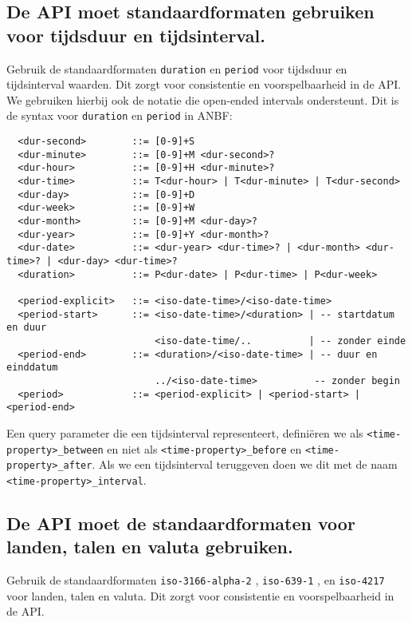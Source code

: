\subsection{De API moet standaardformaten gebruiken voor tijdsduur en tijdsinterval.}
\label{section:standaardformaten_tijdsduur_tijdsinterval}

Gebruik de standaardformaten \texttt{duration} en \texttt{period} voor tijdsduur en tijdsinterval waarden. Dit zorgt voor consistentie en voorspelbaarheid in de API. We gebruiken hierbij ook de \textcite{rfc3339} notatie die open-ended intervals ondersteunt. Dit is de syntax voor \texttt{duration} en \texttt{period} in ANBF:

\begin{verbatim}
  <dur-second>        ::= [0-9]+S
  <dur-minute>        ::= [0-9]+M <dur-second>?
  <dur-hour>          ::= [0-9]+H <dur-minute>?
  <dur-time>          ::= T<dur-hour> | T<dur-minute> | T<dur-second>
  <dur-day>           ::= [0-9]+D
  <dur-week>          ::= [0-9]+W
  <dur-month>         ::= [0-9]+M <dur-day>?
  <dur-year>          ::= [0-9]+Y <dur-month>?
  <dur-date>          ::= <dur-year> <dur-time>? | <dur-month> <dur-time>? | <dur-day> <dur-time>?
  <duration>          ::= P<dur-date> | P<dur-time> | P<dur-week>

  <period-explicit>   ::= <iso-date-time>/<iso-date-time>
  <period-start>      ::= <iso-date-time>/<duration> | -- startdatum en duur
                          <iso-date-time/..          | -- zonder einde
  <period-end>        ::= <duration>/<iso-date-time> | -- duur en einddatum
                          ../<iso-date-time>          -- zonder begin
  <period>            ::= <period-explicit> | <period-start> | <period-end>
\end{verbatim}

Een query parameter die een tijdsinterval representeert, definiëren we als \texttt{<time-property>\_between} en niet als \texttt{<time-property>\_before} en \texttt{<time-property>\_after}. Als we een tijdsinterval teruggeven doen we dit met de naam \texttt{<time-property>\_interval}.

\subsection{De API moet de standaardformaten voor landen, talen en valuta gebruiken.}
\label{section:standaardformaten_landen_talen_valuta}

Gebruik de standaardformaten \texttt{iso-3166-alpha-2} \autocite{iso3166-1}, \texttt{iso-639-1} \autocite{iso639}, en \texttt{iso-4217} \autocite{iso4217} voor landen, talen en valuta. Dit zorgt voor consistentie en voorspelbaarheid in de API.

